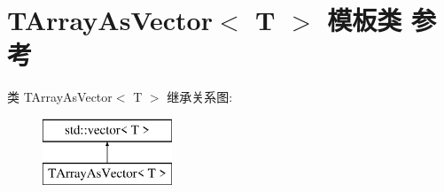 \hypertarget{class_t_array_as_vector}{}\section{T\+Array\+As\+Vector$<$ T $>$ 模板类 参考}
\label{class_t_array_as_vector}
类 T\+Array\+As\+Vector$<$ T $>$ 继承关系图\+:\begin{figure}[H]
\begin{center}
\leavevmode
\includegraphics[height=2.000000cm]{class_t_array_as_vector}
\end{center}
\end{figure}
